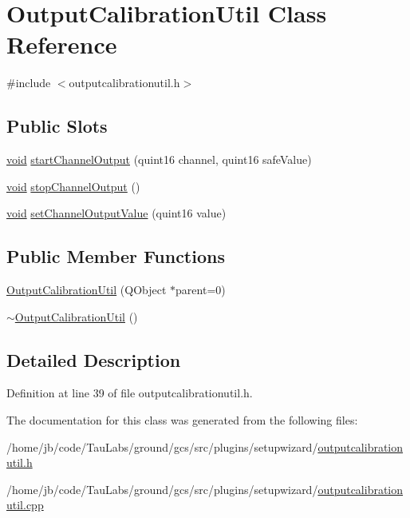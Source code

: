 \hypertarget{class_output_calibration_util}{\section{\-Output\-Calibration\-Util \-Class \-Reference}
\label{class_output_calibration_util}
}


{\ttfamily \#include $<$outputcalibrationutil.\-h$>$}

\subsection*{\-Public \-Slots}
\begin{DoxyCompactItemize}
\item 
\hyperlink{group___u_a_v_objects_plugin_ga444cf2ff3f0ecbe028adce838d373f5c}{void} \hyperlink{group___output_calibration_util_ga4e257b02b35e22c737c50cbeab039173}{start\-Channel\-Output} (quint16 channel, quint16 safe\-Value)
\item 
\hyperlink{group___u_a_v_objects_plugin_ga444cf2ff3f0ecbe028adce838d373f5c}{void} \hyperlink{group___output_calibration_util_ga82c5762c4c3caeebb767eff46035ba59}{stop\-Channel\-Output} ()
\item 
\hyperlink{group___u_a_v_objects_plugin_ga444cf2ff3f0ecbe028adce838d373f5c}{void} \hyperlink{group___output_calibration_util_gae8a819e164b2c70af5e6e884ffea3519}{set\-Channel\-Output\-Value} (quint16 value)
\end{DoxyCompactItemize}
\subsection*{\-Public \-Member \-Functions}
\begin{DoxyCompactItemize}
\item 
\hyperlink{group___output_calibration_util_gad4fa78a9ae7280d3f4476614ab1b75bc}{\-Output\-Calibration\-Util} (\-Q\-Object $\ast$parent=0)
\item 
\hyperlink{group___output_calibration_util_gabc2baa99b6831e09b1a481dbdcae92ab}{$\sim$\-Output\-Calibration\-Util} ()
\end{DoxyCompactItemize}


\subsection{\-Detailed \-Description}


\-Definition at line 39 of file outputcalibrationutil.\-h.



\-The documentation for this class was generated from the following files\-:\begin{DoxyCompactItemize}
\item 
/home/jb/code/\-Tau\-Labs/ground/gcs/src/plugins/setupwizard/\hyperlink{outputcalibrationutil_8h}{outputcalibrationutil.\-h}\item 
/home/jb/code/\-Tau\-Labs/ground/gcs/src/plugins/setupwizard/\hyperlink{outputcalibrationutil_8cpp}{outputcalibrationutil.\-cpp}\end{DoxyCompactItemize}
